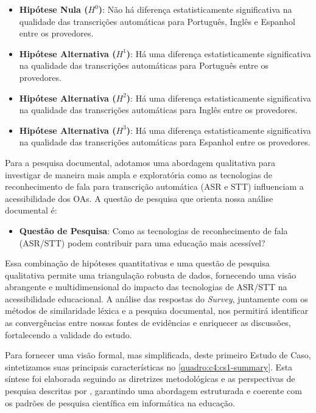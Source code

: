 \begin{itemize}
\item \textbf{Hipótese Nula ($H^0$)}: Não há diferença estatisticamente significativa na qualidade das transcrições automáticas para Português, Inglês e Espanhol entre os provedores.
\item \textbf{Hipótese Alternativa ($H^1$)}: Há uma diferença estatisticamente significativa na qualidade das transcrições automáticas para Português entre os provedores.
\item \textbf{Hipótese Alternativa ($H^2$)}: Há uma diferença estatisticamente significativa na qualidade das transcrições automáticas para Inglês entre os provedores.
\item \textbf{Hipótese Alternativa ($H^3$)}: Há uma diferença estatisticamente significativa na qualidade das transcrições automáticas para Espanhol entre os provedores.
\end{itemize}

Para a pesquisa documental, adotamos uma abordagem qualitativa para investigar de maneira mais ampla e exploratória como as tecnologias de reconhecimento de fala para transcrição automática (ASR e STT) influenciam a acessibilidade dos OAs. A questão de pesquisa que orienta nossa análise documental é:

\begin{itemize}
\item \textbf{Questão de Pesquisa}: Como as tecnologias de reconhecimento de fala (ASR/STT) podem contribuir para uma educação mais acessível?
\end{itemize}

Essa combinação de hipóteses quantitativas e uma questão de pesquisa qualitativa permite uma triangulação robusta de dados, fornecendo uma visão abrangente e multidimensional do impacto das tecnologias de ASR/STT na acessibilidade educacional. A análise das respostas do \textit{Survey}, juntamente com os métodos de similaridade léxica e a pesquisa documental, nos permitirá identificar as convergências entre nossas fontes de evidências e enriquecer as discussões, fortalecendo a validade do estudo.

Para fornecer uma visão formal, mas simplificada, deste primeiro Estudo de Caso, sintetizamos suas principais características no \autoref{quadro:c4:cs1-summary}. Esta síntese foi elaborada seguindo as diretrizes metodológicas e as perspectivas de pesquisa descritas por , garantindo uma abordagem estruturada e coerente com os padrões de pesquisa científica em informática na educação.

